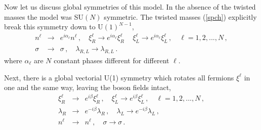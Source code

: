 \documentclass[epsfig,12pt]{article}
\def\beq{\begin{equation}}
\def\eeq{\end{equation}}
\def\beqn{\begin{eqnarray}}
\def\eeqn{\end{eqnarray}}
\newcommand{\ntwo}{${\mathcal N}=2\,$}
\def\beqn{\begin{eqnarray}}
\def\eeqn{\end{eqnarray}}
\def\beq{\begin{equation}}
\def\eeq{\end{equation}}
\begin{document}

Now let us discuss global symmetries of this model. In the absence of the twisted masses
the model was SU$(N)$ symmetric. The twisted masses (\ref{spch}) explicitly break this symmetry down to U$(1)^{N-1}$,
\beqn
n^\ell&\to& e^{i\alpha_\ell}n^\ell\,,\quad \xi^\ell_R \to e^{i\alpha_\ell}\xi^\ell_R\,
\quad \xi^\ell_L \to e^{i\alpha_\ell}\xi^\ell_L\,,\quad \ell=1,2, ..., N\,,
\nonumber\\[2mm]
\sigma
&\to&
 \sigma\,,\quad \lambda_{R,L}\to \lambda_{R,L}\,.
\eeqn
where $\alpha_\ell$ are $N$ constant phases different for different $\ell$. 

Next, there is a global vectorial U(1) symmetry which rotates all fermions $\xi^\ell$
in one and the same way, leaving the boson fields intact,
\beqn
\xi^\ell_R 
&\to& 
e^{i\beta}\xi^\ell_R\,, \quad
 \xi^\ell_L \to e^{i\beta}\xi^\ell_L\,,\quad \ell=1,2, ..., N\,,
\nonumber\\[2mm]
\lambda_R 
&\to&
 e^{-i\beta}\lambda_R\,,\quad 
\lambda_L \to e^{-i\beta}\lambda_L\,,
\nonumber\\[2mm]
n^\ell &\to& n^\ell\,,\quad \sigma\to\sigma\,.
\eeqn
\end{document}
